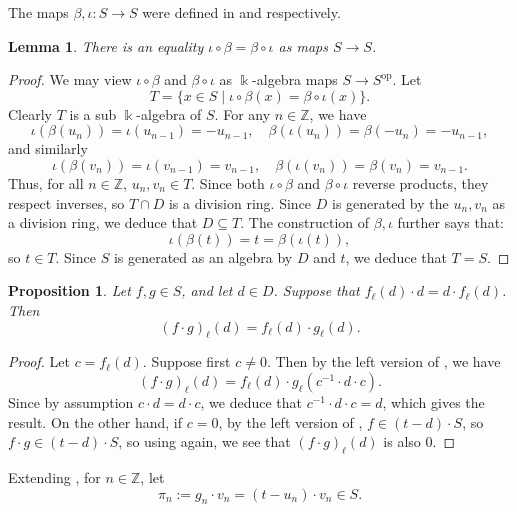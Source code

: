 \documentclass{amsart}
\newtheorem{prop}[equation]{Proposition}
\newtheorem{lem}[equation]{Lemma}
\theoremstyle{definition}
\newcommand{\opn}{\operatorname}
\renewcommand{\k}{\Bbbk}
\numberwithin{equation}{section}
\begin{document}
The maps $\beta, \iota:S \to S$ were defined in  and  respectively.

\begin{lem}\label{lem:iotabeta}
There is an equality $\iota\circ \beta = \beta \circ \iota$ as maps $S \to S$.
\end{lem}
\begin{proof}
We may view $\iota\circ \beta$ and $\beta\circ \iota$ as $\k$-algebra maps $S \to S^{\opn{op}}$.
Let 
\[
T = \{x \in S\mid \iota\circ \beta(x) = \beta \circ \iota(x)\}.
\]
Clearly $T$ is a sub $\k$-algebra of $S$.
For any $n \in \mathbb{Z}$,
we have
\[
\iota(\beta(u_n)) = \iota(u_{n-1}) = -u_{n-1},
\quad
\beta(\iota(u_n)) = \beta(-u_n) = -u_{n-1},
\]
and similarly 
\[
\iota(\beta(v_n)) = \iota(v_{n-1}) = v_{n-1},
\quad
\beta(\iota(v_n)) = \beta(v_n) = v_{n-1}.
\]
Thus, for all $n \in \mathbb{Z}$, $u_n, v_n \in T$.
Since both $\iota \circ \beta$ and $\beta \circ \iota$ reverse products,
they respect inverses, so $T \cap D$ is a division ring.
Since $D$ is generated by the $u_n, v_n$ as a division ring,
we deduce that $D \subseteq T$.
The construction of $\beta, \iota$ further says that:
\[
\iota(\beta(t)) = t = \beta(\iota(t)),
\]
so $t \in T$. Since $S$ is generated as an algebra by $D$ and $t$,
we deduce that $T = S$.
\end{proof}

\begin{prop}\label{prop:ellmult}
Let $f,g \in S$,
and let $d \in D$.
Suppose that $f_{\ell}(d)\cdot d = d\cdot f_{\ell}(d)$.
Then 
\[
(f\cdot g)_{\ell}(d) = f_{\ell}(d) \cdot g_{\ell}(d).
\]
\end{prop}
\begin{proof}
Let $c = f_{\ell}(d)$.
Suppose first $c \ne 0$.
Then by the left version of \cite[Proposition 16.3]{Lam},
we have
\[
(f\cdot g)_{\ell}(d) = f_{\ell}(d) \cdot g_{\ell}(c^{-1}\cdot d \cdot c).
\]
Since by assumption $c\cdot d = d\cdot c$, we deduce that $c^{-1}\cdot d \cdot c = d$, which gives the result.
On the other hand, if $c = 0$,
by the left version of \cite[Proposition 16.2]{Lam},
$f \in (t-d)\cdot S$, so $f\cdot g \in (t-d)\cdot S$,
so using \cite[Proposition 16.2]{Lam} again, we see that $(f\cdot g)_{\ell}(d)$ is also $0$.
\end{proof}

Extending ,
for $n \in \mathbb{Z}$, let 
\begin{equation}\label{eqn:pin-def}
\pi_n := g_n \cdot v_n = (t-u_n)\cdot v_n \in S.
\end{equation}
\end{document}
